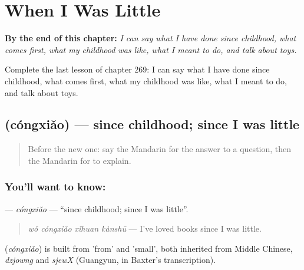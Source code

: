 
\chapter{When I Was Little}
\label{ch:zh-when-i-was-little}

\begin{chapteropening}
\textbf{By the end of this chapter:} \emph{I can say what I have done since childhood, what comes first, what my childhood was like, what I meant to do, and talk about toys.}

Complete the last lesson of chapter 269: I can say what I have done since childhood, what comes first, what my childhood was like, what I meant to do, and talk about toys.
\end{chapteropening}

\section[\texorpdfstring{\zh{从小} (cóngxiǎo)}{从小 (cóngxiǎo)}]{ (cóngxiǎo) — since childhood; since I was little}

\label{lesson:ZH-C269-congxiao}



\begin{quote}
Before the new one: say the Mandarin for the answer to a question, then the Mandarin for to explain.
\end{quote}

\subsection*{You'll want to know: }
\textbf{} — \emph{cóngxiǎo} — \textquotedblleft{}since childhood; since I was little\textquotedblright{}.

\begin{quote}
\textbf{} \emph{wǒ cóngxiǎo xǐhuan kànshū} — I've loved books since I was little.
\end{quote}

\begin{cousinweb}
\textbf{} (\emph{cóngxiǎo}) is built from  'from' and  'small', both inherited from Middle Chinese, \emph{dzjowng} and \emph{sjewX} (Guangyun, in Baxter's transcription).
\end{cousinweb}

